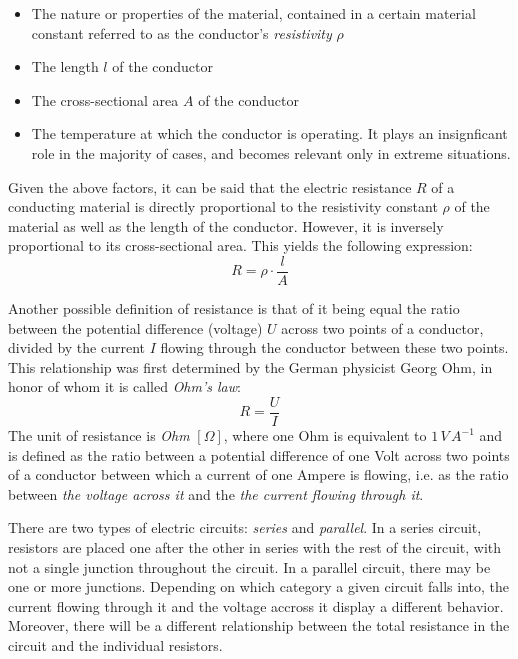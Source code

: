 \begin{itemize}

	\item The nature or properties of the material, contained in a certain material constant referred to as the conductor's \emph{resistivity} $\rho$

	\item The length $l$ of the conductor

	\item The cross-sectional area $A$ of the conductor

	\item The temperature at which the conductor is operating. It plays an insignficant role in the majority of cases, and becomes relevant only in extreme situations.
\end{itemize}

Given the above factors, it can be said that the electric resistance $R$ of a conducting material is directly proportional to the resistivity constant $\rho$ of the material as well as the length of the conductor. However, it is inversely proportional to its cross-sectional area. This yields the following expression: $$R = \rho \cdot \frac{l}{A}$$

\pagebreak

Another possible definition of resistance is that of it being equal the ratio between the potential difference (voltage) $U$ across two points of a conductor, divided by the current $I$ flowing through the conductor between these two points. This relationship was first determined by the German physicist Georg Ohm, in honor of whom it is called \emph{Ohm's law}: $$R = \frac{U}{I}$$ The unit of resistance is \emph{Ohm} $[\Omega]$, where one Ohm is equivalent to $1\, V\, A^{-1}$ and is defined as the ratio between a potential difference of one Volt across two points of a conductor between which a current of one Ampere is flowing, i.e. as the ratio between \emph{the voltage across it} and the \emph{the current flowing through it}.


There are two types of electric circuits: \emph{series} and \emph{parallel}. In a series circuit, resistors are placed one after the other in series with the rest of the circuit, with not a single junction throughout the circuit. In a parallel circuit, there may be one or more junctions. Depending on which category a given circuit falls into, the current flowing through it and the voltage accross it display a different behavior. Moreover, there will be a different relationship between the total resistance in the circuit and the individual resistors.

